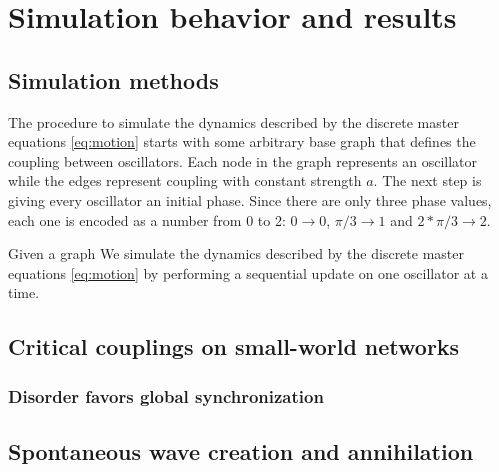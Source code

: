 \chapter{Simulation behavior and results}
\label{chap:simulation}

\section{Simulation methods}

The procedure to simulate the dynamics described by the discrete master equations \ref{eq:motion} starts with some arbitrary base graph
that defines the coupling between oscillators. Each node in the graph represents an oscillator while the edges represent coupling with
constant strength $a$. The next step is giving every oscillator an initial phase. Since there are only three phase values, each one is
encoded as a number from 0 to 2: $0 \rightarrow 0$, $\pi/3 \rightarrow 1$ and $2*\pi/3 \rightarrow 2$.

Given a graph
We simulate the dynamics described by the discrete master equations \ref{eq:motion} by performing a sequential update on one oscillator
at a time. 


\section{Critical couplings on small-world networks}

\subsection{Disorder favors global synchronization}

\section{Spontaneous wave creation and annihilation}
